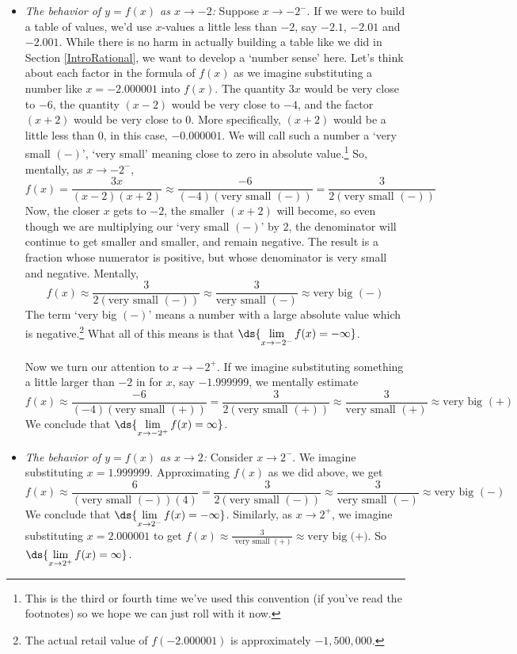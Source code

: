 \documentclass{ximera}
\begin{document}
\begin{example}
\begin{enumerate}
\begin{itemize}
\item  \textit{The behavior of $y=f(x)$ as $x \rightarrow -2$:}  Suppose $x \rightarrow -2^{-}$.  If we were to build a table of values, we'd use $x$-values a little less than $-2$, say $-2.1$, $-2.01$ and $-2.001$.  While there is no harm in actually building a table like we did in Section \ref{IntroRational}, we want to develop a `number sense' here.  Let's think about each factor in the formula of $f(x)$ as we imagine substituting a number like $x=-2.000001$ into $f(x)$. The quantity $3x$ would be very close to $-6$, the quantity $(x-2)$ would be very close to $-4$, and the factor $(x+2)$ would be very close to $0$.  More specifically, $(x+2)$ would be a little less than $0$, in this case, $-0.000001.$  We will call such a number a `very small $(-)$', `very small' meaning close to zero in absolute value.\footnote{This is the third or fourth time we've used this convention (if you've read the footnotes) so we hope we can just roll with it now.}  So, mentally, as $x \rightarrow -2^{-}$, \[ f(x)   = \dfrac{3x}{(x-2)(x+2)} \approx \dfrac{-6}{(-4)\left( \text{very small $(-)$}\right)} = \dfrac{3}{2 \left( \text{very small $(-)$}\right)} \]  Now, the closer $x$ gets to $-2$, the smaller $(x+2)$ will become, so even though we are multiplying our `very small $(-)$' by $2$, the denominator will continue to get smaller and smaller, and remain negative.  The result is a fraction whose numerator is positive, but whose denominator is very small and negative.  Mentally, \[f(x) \approx \dfrac{3}{2 \left( \text{very small $(-)$}\right)} \approx \dfrac{3}{\text{very small $(-)$}} \approx \text{very big $(-)$}\]  The term `very big $(-)$' means a number with a large absolute value which is negative.\footnote{The actual retail value of $f(-2.000001)$ is approximately $-1,\!500,\!000$.}  What all of this means is that  $\ds{ \lim_{x \rightarrow -2^{-}} f(x) = -\infty}$.    

Now we turn our attention to $x \rightarrow -2^{+}$.  If we imagine substituting something a little larger than $-2$ in for $x$, say $-1.999999$, we mentally estimate \[ f(x) \approx \dfrac{-6}{(-4)\left( \text{very small $(+)$}\right)} = \dfrac{3}{2 \left( \text{very small $(+)$}\right)}  \approx \dfrac{3}{\text{very small $(+)$}} \approx \text{very big $(+)$}\]  We conclude that $\ds{ \lim_{x \rightarrow -2^{+}} f(x) = \infty}$.

\item  \textit{The behavior of $y=f(x)$ as $x \rightarrow 2$:} Consider $x \rightarrow 2^{-}$. We imagine substituting $x = 1.999999$.  Approximating $f(x)$ as we did above, we get \[ f(x) \approx \dfrac{6}{\left( \text{very small $(-)$}\right)(4)} = \dfrac{3}{2 \left( \text{very small $(-)$}\right)}  \approx \dfrac{3}{\text{very small $(-)$}} \approx \text{very big $(-)$}\]  We conclude that $\ds{ \lim_{x \rightarrow 2^{-}} f(x) = -\infty}$.  Similarly, as $x \rightarrow 2^{+}$, we imagine substituting $x = 2.000001$ to get $f(x) \approx \frac{3}{\text{ very small $(+)$}} \approx \text{very big (+)}$.  So $\ds{ \lim_{x \rightarrow 2^{+}} f(x) = \infty}$.
\end{itemize}


\end{enumerate}
\end{example}
\end{document}
